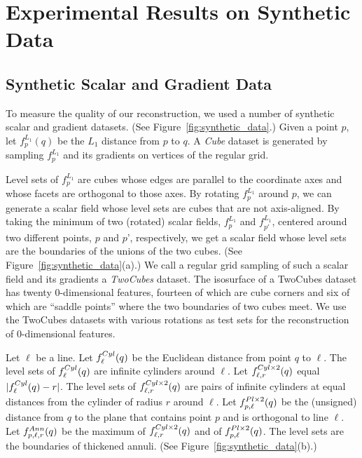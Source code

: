 \section{Experimental Results on Synthetic Data}\label{sec:synData}
\label{section:results}

\subsection{Synthetic Scalar and Gradient Data}
\label{section:synthetic}

To measure the quality of our reconstruction,
we used a number of synthetic scalar and gradient datasets.
(See Figure~\ref{fig:synthetic_data}.)
Given a point $p$,
let $f^{L_1}_{p}(q)$ be the $L_1$ distance from $p$ to $q$.
A {\em Cube} dataset is generated by sampling $f^{L_1}_p$
and its gradients on vertices of the regular grid.

Level sets of $f^{L_1}_p$ are cubes whose edges are
parallel to the coordinate axes
and whose facets are orthogonal to those axes.
By rotating $f^{L_1}_p$ around $p$, 
we can generate a scalar field whose level sets are cubes
that are not axis-aligned.
By taking the minimum of two (rotated) scalar fields, 
$f^{L_1}_p$ and $f^{L_1}_{p'}$, 
centered around two different points, $p$ and $p$', respectively,
we get a scalar field whose level sets are the boundaries
of the unions of the two cubes.
(See Figure~\ref{fig:synthetic_data}(a).)
We call a regular grid sampling of such a scalar field
and its gradients a {\em TwoCubes} dataset.
The isosurface of a TwoCubes dataset has twenty 0-dimensional features,
fourteen of which are cube corners and six of which are ``saddle points''
where the two boundaries of two cubes meet.
We use the TwoCubes datasets with various rotations
as test sets for the reconstruction of 0-dimensional features.

Let $\ell$ be a line.
Let $f^{Cyl}_{\ell}(q)$ be the Euclidean distance from point $q$ to $\ell$.
The level sets of $f^{Cyl}_{\ell}(q)$ are infinite cylinders around $\ell$.
Let $f^{Cyl \times 2}_{\ell,r}(q)$ equal $|f^{Cyl}_{\ell}(q) - r|$.
The level sets of $f^{Cyl \times 2}_{\ell,r}(q)$  are pairs of infinite cylinders
at equal distances from the cylinder of radius $r$ around $\ell$.
Let $f^{Pl \times 2}_{p,\ell}(q)$ be the (unsigned) distance from $q$ to the plane
that contains point $p$ and is orthogonal to line $\ell$.
Let $f^{Ann}_{p,\ell,r}(q)$ be the maximum 
of $f^{Cyl \times 2}_{\ell,r}(q)$ and of $f^{Pl \times 2}_{p,\ell}(q)$.
The level sets are the boundaries of thickened annuli.
(See Figure~\ref{fig:synthetic_data}(b).)

